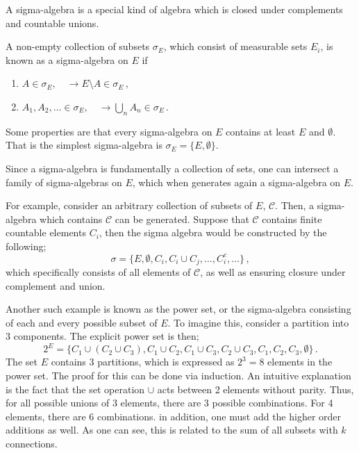 A sigma-algebra is a special kind of algebra which is closed under complements and countable unions.
\begin{definition}
	A non-empty collection of subsets $\sigma_E$, which consist of measurable sets $E_i$, is known as a sigma-algebra on $E$ if 
	\begin{enumerate}
		\item $A \in \sigma_E,  \quad \rightarrow E\setminus A \in \sigma_E\,,$
		\item $A_1, A_2, \dots \in \sigma_E, \quad \rightarrow \bigcup_n A_n \in \sigma_E\,.$
	\end{enumerate}
	Some properties are that every sigma-algebra on $E$ contains at least $E$ and $\emptyset$. That is the simplest sigma-algebra is $\sigma_E = \{E, \emptyset\}$.
\end{definition}

Since a sigma-algebra is fundamentally a collection of sets, one can intersect a family of sigma-algebras on $E$, which when generates again a sigma-algebra on $E$. 

For example, consider an arbitrary collection of subsets of $E$, $\mathcal{C}$. Then, a sigma-algebra which contains $\mathcal{C}$ can be generated. Suppose that $\mathcal{C}$ contains finite countable elements $C_i$, then the sigma algebra would be constructed by the following;
\begin{equation}
	\sigma = \{E, \emptyset, C_i, C_i \cup C_j, \dots, C_i^c, \dots\}\,,
\end{equation}
which specifically consists of all elements of $\mathcal{C}$, as well as ensuring closure under complement and union. 

Another such example is known as the power set, or the sigma-algebra consisting of each and every possible subset of $E$. To imagine this, consider a partition into 3 components. The explicit power set is then;
\begin{equation}
	2^E = \{C_1\cup(C_2 \cup C_3), C_1 \cup C_2, C_1 \cup C_3, C_2 \cup C_3, C_1, C_2, C_3, \emptyset \}\,.
\end{equation}
The set $E$ contains 3 partitions, which is expressed as $2^3 = 8$ elements in the power set. The proof for this can be done via induction. An intuitive explanation is the fact that the set operation $\cup$ acts between 2 elements without parity. Thus, for all possible unions of 3 elements, there are 3 possible combinations. For 4 elements, there are 6 combinations. in addition, one must add the higher order additions as well.  As one can see, this is related to the sum of all subsets with $k$ connections. 

